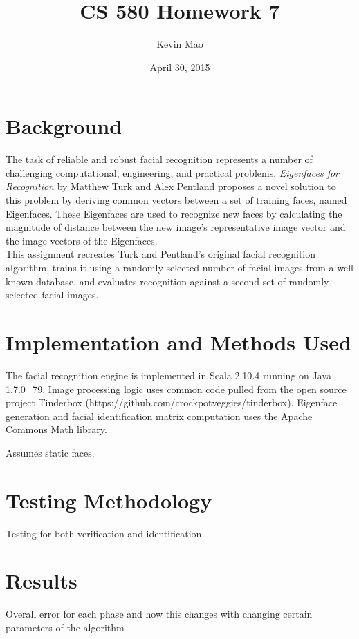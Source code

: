 \documentclass[11pt]{article}
\begin{document}
\title{CS 580 Homework 7}
\author{Kevin Mao}
\date{April 30, 2015}
\maketitle

\section*{Background}

The task of reliable and robust facial recognition represents a number of challenging computational, engineering, and practical problems. \textit{Eigenfaces for Recognition} by Matthew Turk and Alex Pentland proposes a novel solution to this problem by deriving common vectors between a set of training faces, named Eigenfaces. These Eigenfaces are used to recognize new faces by calculating the magnitude of distance between the new image's representative image vector and the image vectors of the Eigenfaces.\\

\noindent
This assignment recreates Turk and Pentland's original facial recognition algorithm, trains it using a randomly selected number of facial images from a well known database, and evaluates recognition against a second set of randomly selected facial images.

\section*{Implementation and Methods Used}
The facial recognition engine is implemented in Scala 2.10.4 running on Java 1.7.0\_79. Image processing logic uses common code pulled from the open source project Tinderbox (https://github.com/crockpotveggies/tinderbox). Eigenface generation and facial identification matrix computation uses the Apache Commons Math library.

Assumes static faces.

\section*{Testing Methodology}

Testing for both verification and identification


\section*{Results}

Overall error for each phase and how this changes with changing certain parameters of the algorithm
\end{document}
